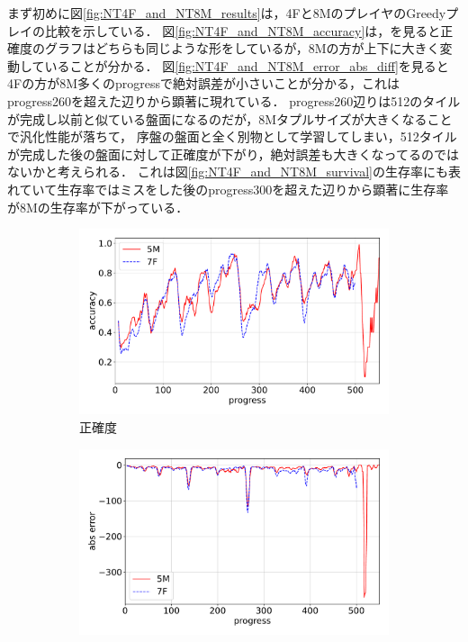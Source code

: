 まず初めに図\ref{fig:NT4F_and_NT8M_results}は，4Fと8MのプレイヤのGreedyプレイの比較を示している．
図\ref{fig:NT4F_and_NT8M_accuracy}は，を見ると正確度のグラフはどちらも同じような形をしているが，8Mの方が上下に大きく変動していることが分かる．
図\ref{fig:NT4F_and_NT8M_error_abs_diff}を見ると4Fの方が8M多くのprogressで絶対誤差が小さいことが分かる，これはprogress260を超えた辺りから顕著に現れている．
progress260辺りは512のタイルが完成し以前と似ている盤面になるのだが，8Mタプルサイズが大きくなることで汎化性能が落ちて，
序盤の盤面と全く別物として学習してしまい，512タイルが完成した後の盤面に対して正確度が下がり，絶対誤差も大きくなってるのではないかと考えられる．
これは図\ref{fig:NT4F_and_NT8M_survival}の生存率にも表れていて生存率ではミスをした後のprogress300を超えた辺りから顕著に生存率が8Mの生存率が下がっている．

\begin{figure}[t]
\centering
\begin{subfigure}[b]{0.8\linewidth}
    \includegraphics[width=\linewidth]{pdf/compare/NT5M_and_NT7F/accuracy.pdf}
    \caption{正確度}
    \label{fig:NT5M_and_NT7F_accuracy}
\end{subfigure}
\begin{subfigure}[b]{0.8\linewidth}
    \includegraphics[width=\linewidth]{pdf/compare/NT5M_and_NT7F/error_abs.pdf}

\end{subfigure}
\end{figure}
